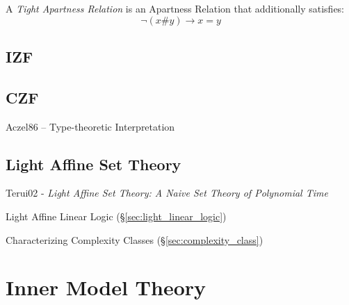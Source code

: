 A \emph{Tight Apartness Relation} is an Apartness Relation that
additionally satisfies:
\[
  \neg (x \# y) \rightarrow x = y
\]



\subsection{IZF}\label{sec:izf}

\subsection{CZF}\label{sec:czf}

Aczel86 -- Type-theoretic Interpretation



\subsection{Light Affine Set Theory}\label{sec:light_affine_set_theory}

Terui02 - \emph{Light Affine Set Theory: A Naive Set Theory of Polynomial Time}

Light Affine Linear Logic (\S\ref{sec:light_linear_logic})

Characterizing Complexity Classes (\S\ref{sec:complexity_class})



\section{Inner Model Theory}\label{sec:inner_model_theory}
